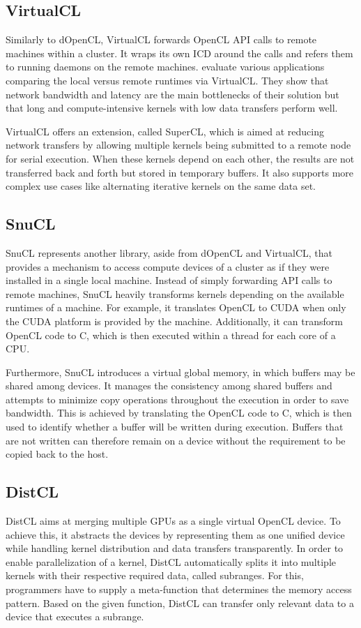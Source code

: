 \subsection*{VirtualCL}

Similarly to dOpenCL, VirtualCL forwards OpenCL API calls to remote machines within a cluster\cite{virtualcl}. It wraps its own ICD around the calls and refers them to running daemons on the remote machines. \citeauthor{virtualcl} evaluate various applications comparing the local versus remote runtimes via VirtualCL. They show that network bandwidth and latency are the main bottlenecks of their solution but that long and compute-intensive kernels with low data transfers perform well.

VirtualCL offers an extension, called SuperCL, which is aimed at reducing network transfers by allowing multiple kernels being submitted to a remote node for serial execution. When these kernels depend on each other, the results are not transferred back and forth but stored in temporary buffers. It also supports more complex use cases like alternating iterative kernels on the same data set.

\subsection*{SnuCL}

SnuCL represents another library, aside from dOpenCL and VirtualCL, that provides a mechanism to access compute devices of a cluster as if they were installed in a single local machine\cite{snucl}. Instead of simply forwarding API calls to remote machines, SnuCL heavily transforms kernels depending on the available runtimes of a machine. For example, it translates OpenCL to CUDA when only the CUDA platform is provided by the machine. Additionally, it can transform OpenCL code to C, which is then executed within a thread for each core of a CPU.

Furthermore, SnuCL introduces a virtual global memory, in which buffers may be shared among devices. It manages the consistency among shared buffers and attempts to minimize copy operations throughout the execution in order to save bandwidth. This is achieved by translating the OpenCL code to C, which is then used to identify whether a buffer will be written during execution. Buffers that are not written can therefore remain on a device without the requirement to be copied back to the host.

\subsection*{DistCL}
DistCL aims at merging multiple GPUs as a single virtual OpenCL device\cite{distcl}. To achieve this, it abstracts the devices by representing them as one unified device while handling kernel distribution and data transfers transparently. In order to enable parallelization of a kernel, DistCL automatically splits it into multiple kernels with their respective required data, called subranges. For this, programmers have to supply a meta-function that determines the memory access pattern. Based on the given function, DistCL can transfer only relevant data to a device that executes a subrange.

